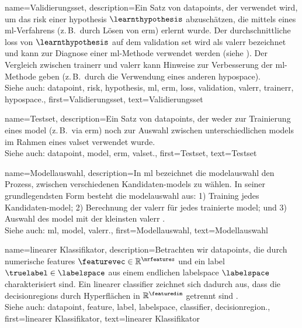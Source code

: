 {{{{
{name={Validierungsset},
 	description={Ein Satz von \glspl{datapoint}, der verwendet wird, 
  		um das \gls{risk} einer \gls{hypothesis} $\learnthypothesis$ abzuschätzen, 
  		die mittels eines \gls{ml}-Verfahrens (z.\,B.\ durch Lösen von \gls{erm}) erlernt wurde. 
		Der durchschnittliche \gls{loss} von $\learnthypothesis$ auf dem 
		\gls{validation} set wird als \gls{valerr} bezeichnet und kann zur Diagnose einer 
		\gls{ml}-Methode verwendet werden (siehe \cite[Sec. 6.6]{MLBasics}). 
		Der Vergleich zwischen \gls{trainerr} und \gls{valerr} kann Hinweise zur Verbesserung 
		der \gls{ml}-Methode geben (z.\,B.\ durch die Verwendung eines anderen \gls{hypospace}). 
			\\
		Siehe auch: \gls{datapoint}, \gls{risk}, \gls{hypothesis}, \gls{ml}, \gls{erm}, \gls{loss}, \gls{validation}, \gls{valerr}, \gls{trainerr}, \gls{hypospace}.},
	first={Validierungsset},
	text={Validierungsset}  
}

{name={Testset},
	description={Ein Satz von \glspl{datapoint}, der weder zur 
		Trainierung eines \gls{model} (z.\,B.\ via \gls{erm}) noch zur Auswahl zwischen 
		unterschiedlichen \glspl{model} im Rahmen eines \gls{valset} verwendet wurde.
				\\
		Siehe auch: \gls{datapoint}, \gls{model}, \gls{erm}, \gls{valset}.},
	first={Testset},
	text={Testset}  
}

{name={Modellauswahl},
	description={In \gls{ml} bezeichnet die \gls{model}auswahl 
		den Prozess, zwischen verschiedenen Kandidaten-\glspl{model} zu wählen. 
		In seiner grundlegendsten Form besteht die \gls{model}auswahl aus: 
		1) Training jedes Kandidaten-\gls{model}; 
		2) Berechnung der \gls{valerr} für jedes trainierte \gls{model}; und 
		3) Auswahl des \gls{model} mit der kleinsten \gls{valerr} \cite[Ch. 6]{MLBasics}. 
				\\
		Siehe auch: \gls{ml}, \gls{model}, \gls{valerr}.},
	first={Modellauswahl},
	text={Modellauswahl}  
}

{name={linearer Klassifikator}, 
	description={Betrachten wir \glspl{datapoint}, die durch numerische \glspl{feature} $\featurevec \in \mathbb{R}^{\nrfeatures}$ 
	    	und ein \gls{label} $\truelabel \in \labelspace$ aus einem endlichen \gls{labelspace} $\labelspace$ charakterisiert sind. 
		Ein linearer \gls{classifier} zeichnet sich dadurch aus, dass die \glspl{decisionregion} 
		durch Hyperflächen in $\mathbb{R}^{\featuredim}$ getrennt sind \cite[Ch. 2]{MLBasics}.
				\\
		Siehe auch: \gls{datapoint}, \gls{feature}, \gls{label}, \gls{labelspace}, \gls{classifier}, \gls{decisionregion}.},
	first={linearer Klassifikator},
	text={linearer Klassifikator} 
}

}}}}
